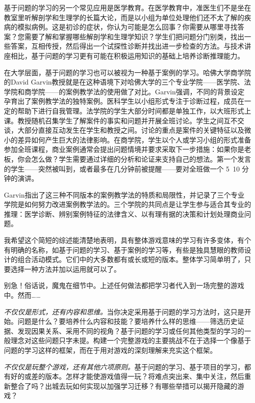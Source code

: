 基于问题的学习的另一个常见应用是医学教育。在医学教育中，准医生们不是坐在教室里听解剖学和生理学的长篇大论，而是以小组为单位处理他们还不太了解的疾病的模拟病例。这是初诊的症状，你认为可能是怎么回事？你需要从哪里寻找答案？您需要了解和掌握哪些解剖学和生理学知识？学生们把问题分门别类，找出一些答案，互相传授，然后得出一个试探性诊断并找出进一步检查的方法。与技术讲座相比，基于问题的学习更有可能在积极运用知识的基础上培养诊断推理能力。

在大学层面，基于问题的学习也可以被视为一种基于案例的学习。哈佛大学商学院的David Garvin教授就是在这种语境下对哈佛大学的三个专业学院——医学院、法学院和商学院——的案例教学法的使用做了对比。Garvin强调，不同的背景设定孕育出了案例教学法的独特案例。医科学生以小组形式专注于诊断过程，成员在一定的帮助下进行自我管理。法学院的学生大部分时间都是单独工作，以大班形式上课。教授随机召集学生了解案件的事实和问题并开展全班讨论。学生之间互不交谈，大部分直接互动发生在学生和教授之间。讨论的重点是案件的关键特征以及微小的差异如何产生巨大的法律影响。在商学院，学生以个人或学习小组的形式准备参加全班课程，商业案例通常会提出问题情境并要求采取下一步措施：如果你是老板，你会怎么做？学生需要通过详细的分析和论证来支持自己的想法。第一个发言的学生——突然被叫到，或者最多在几分钟前被提醒——要对全班做一个 5~10 分钟的演讲。

Garvin指出了这三种不同版本的案例教学法的特质和局限性，并记录了三个专业学院是如何努力改进案例教学法的。三个学院的共同点是让学生参与适合其专业的推理：医学诊断、辨别案例特征的法律含义、以有理有据的决策和计划处理商业问题。

我希望这个简短的综述能清楚地表明，具有整体游戏意味的学习有许多变体，有个有明确的名称，如基于问题的学习、基于案例的学习等，有些是独具慧眼的教师设计的组合活动模式。它们中的大多数都有或长或短的版本。整体学习简单明了，只要选择一种方法并加以运用就可以了。

别急！俗话说，魔鬼在细节中。上述任何做法都把学习者代入到一场完整的游戏中。然而……

\textit{不仅仅是形式，还有内容和思维。}当你决定采用基于问题的学习方法时，这只是开始。问题是什么？要培养什么内容和技能？要培养什么样的思维——筛选历史证据、发现因果关系、采用不同的视角？基于问题的学习或任何其他类型的学习的一般理念对这些问题只字未提。构建一个完整游戏的主要挑战不在于选择一个像基于问题的学习这样的框架，而在于用对游戏的深刻理解来充实这个框架。

\textit{不仅仅是玩整个游戏，还有其他六项原则。}基于问题的学习、基于项目的学习，都有好的或差的版本。怎样才能使游戏值得一玩？将难点突出来、集中关注，然后重新整合了吗？出城去玩如何实现以加强学习迁移？有哪些举措可以揭开隐藏的游戏？

